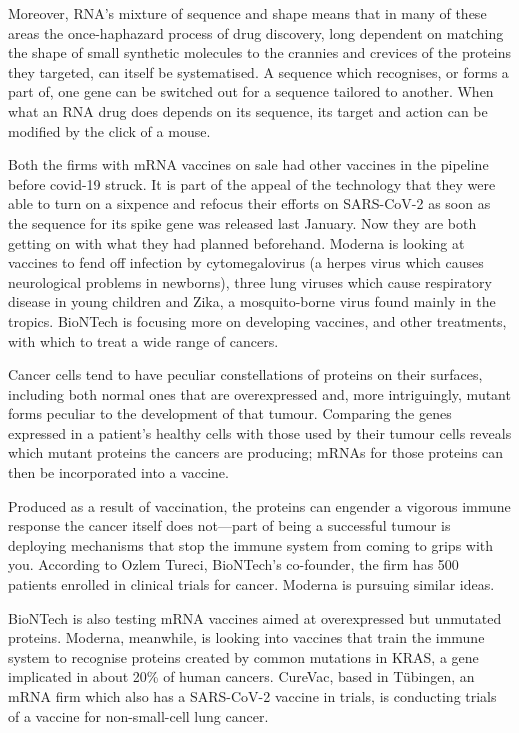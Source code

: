 \documentclass{article}
\begin{document}
Moreover, RNA's mixture of sequence and shape means that in many of these areas the once-haphazard process of drug discovery, long dependent on matching the shape of small synthetic molecules to the crannies and crevices of the proteins they targeted, can itself be systematised. A sequence which recognises, or forms a part of, one gene can be switched out for a sequence tailored to another. When what an RNA drug does depends on its sequence, its target and action can be modified by the click of a mouse. 

Both the firms with mRNA vaccines on sale had other vaccines in the pipeline before covid-19 struck. It is part of the appeal of the technology that they were able to turn on a sixpence and refocus their efforts on SARS-CoV-2 as soon as the sequence for its spike gene was released last January. Now they are both getting on with what they had planned beforehand. Moderna is looking at vaccines to fend off infection by cytomegalovirus (a herpes virus which causes neurological problems in newborns), three lung viruses which cause respiratory disease in young children and Zika, a mosquito-borne virus found mainly in the tropics. BioNTech is focusing more on developing vaccines, and other treatments, with which to treat a wide range of cancers. 

Cancer cells tend to have peculiar constellations of proteins on their surfaces, including both normal ones that are overexpressed and, more intriguingly, mutant forms peculiar to the development of that tumour. Comparing the genes expressed in a patient's healthy cells with those used by their tumour cells reveals which mutant proteins the cancers are producing; mRNAs for those proteins can then be incorporated into a vaccine. 

 

Produced as a result of vaccination, the proteins can engender a vigorous immune response the cancer itself does not---part of being a successful tumour is deploying mechanisms that stop the immune system from coming to grips with you. According to Ozlem Tureci, BioNTech's co-founder, the firm has 500 patients enrolled in clinical trials for cancer. Moderna is pursuing similar ideas. 

BioNTech is also testing mRNA vaccines aimed at overexpressed but unmutated proteins. Moderna, meanwhile, is looking into vaccines that train the immune system to recognise proteins created by common mutations in KRAS, a gene implicated in about 20\% of human cancers. CureVac, based in Tübingen, an mRNA firm which also has a SARS-CoV-2 vaccine in trials, is conducting trials of a vaccine for non-small-cell lung cancer. 
\end{document}
